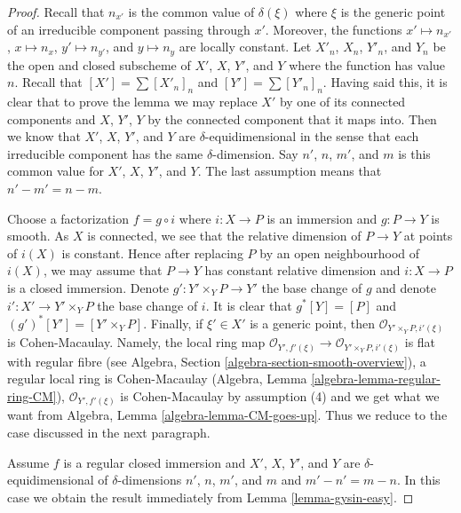 \documentclass[10pt,a4paper]{amsart}
\theoremstyle{plain}
\theoremstyle{definition}
\theoremstyle{remark}
\numberwithin{equation}{subsection}
\begin{document}
\begin{proof}
Recall that $n_{x'}$ is the common value of $\delta(\xi)$
where $\xi$ is the generic point of an irreducible component
passing through $x'$. Moreover, the functions
$x' \mapsto n_{x'}$, $x \mapsto n_x$, $y' \mapsto n_{y'}$, and
$y \mapsto n_y$ are locally constant. Let $X'_n$, $X_n$, $Y'_n$,
and $Y_n$ be the open and closed subscheme of $X'$, $X$, $Y'$, and
$Y$ where the function has value $n$. Recall that
$[X'] = \sum [X'_n]_n$ and $[Y'] = \sum [Y'_n]_n$.
Having said this, it is clear that to prove the lemma we
may replace $X'$ by one of its connected components
and $X$, $Y'$, $Y$ by the connected component that
it maps into. Then we know that $X'$, $X$, $Y'$, and
$Y$ are $\delta$-equidimensional in the sense that
each irreducible component has the same $\delta$-dimension.
Say $n'$, $n$, $m'$, and $m$ is this common value
for $X'$, $X$, $Y'$, and $Y$. The last assumption
means that $n' - m' = n - m$.

\medskip\noindent
Choose a factorization $f = g \circ i$ where $i : X \to P$
is an immersion and $g : P \to Y$ is smooth. As $X$ is connected,
we see that the relative dimension of $P \to Y$ at points of $i(X)$
is constant. Hence after replacing $P$ by an open neighbourhood
of $i(X)$, we may assume that $P \to Y$ has constant relative dimension
and $i : X \to P$ is a closed immersion.
Denote $g' : Y' \times_Y P \to Y'$ the base change of $g$ and denote
$i' : X' \to Y' \times_Y P$ the base change of $i$.
It is clear that $g^*[Y] = [P]$ and $(g')^*[Y'] = [Y' \times_Y P]$.
Finally, if $\xi' \in X'$ is a generic point, then
$\mathcal{O}_{Y' \times_Y P, i'(\xi)}$ is Cohen-Macaulay.
Namely, the local ring map
$\mathcal{O}_{Y', f'(\xi)} \to \mathcal{O}_{Y' \times_Y P, i'(\xi)}$
is flat with regular fibre
(see Algebra, Section \ref{algebra-section-smooth-overview}),
a regular local ring is Cohen-Macaulay
(Algebra, Lemma \ref{algebra-lemma-regular-ring-CM}),
$\mathcal{O}_{Y', f'(\xi)}$ is Cohen-Macaulay by assumption
(4) and we get what we want from
Algebra, Lemma \ref{algebra-lemma-CM-goes-up}.
Thus we reduce to the case discussed in the next paragraph.

\medskip\noindent
Assume $f$ is a regular closed immersion and $X'$, $X$, $Y'$, and
$Y$ are $\delta$-equidimensional of $\delta$-dimensions
$n'$, $n$, $m'$, and $m$ and $m' - n' = m - n$.
In this case we obtain the result immediately from
Lemma \ref{lemma-gysin-easy}.
\end{proof}
\end{document}
